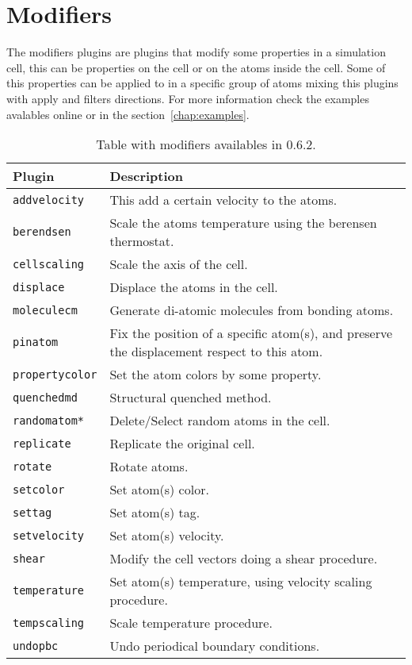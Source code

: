\section{Modifiers}
The modifiers plugins are plugins that modify some properties in a simulation
cell, this can be properties on the cell or on the atoms inside the cell. Some
of this properties can be applied to in a specific group of atoms mixing this
plugins with apply and filters directions. For more information check the
examples avalables online or in the section~\ref{chap:examples}.

\begin{table}[h!]\centering
 \begin{tabular}{|l|p{13cm}|}\hline
 Plugin  & Description \\
 \hline\hline
 \texttt{addvelocity} & This add a certain velocity to the atoms.\\
 \hline
 \texttt{berendsen} & Scale the atoms temperature using the berensen
 thermostat.\\
 \hline
 \texttt{cellscaling} & Scale the axis of the cell.\\
 \hline
 \texttt{displace} & Displace the atoms in the cell.\\
 \hline
 \texttt{moleculecm} & Generate di-atomic molecules from bonding atoms.\\
 \hline
 \texttt{pinatom} & Fix the position of a specific atom(s), and preserve the
 displacement respect to this atom.\\
 \hline
 \texttt{propertycolor} & Set the atom colors by some property.\\
 \hline
 \texttt{quenchedmd} & Structural quenched method.\\
 \hline
 \texttt{randomatom*} & Delete/Select random atoms in the cell.\\
 \hline
 \texttt{replicate} & Replicate the original cell.\\
 \hline
 \texttt{rotate} & Rotate atoms.\\
 \hline
 \texttt{setcolor} & Set atom(s) color.\\
 \hline
 \texttt{settag} & Set atom(s) tag.\\
 \hline
 \texttt{setvelocity} & Set atom(s) velocity.\\
 \hline
 \texttt{shear} & Modify the cell vectors doing a shear procedure.\\
 \hline
 \texttt{temperature} & Set atom(s) temperature, using velocity scaling
 procedure.\\
 \hline
 \texttt{tempscaling} & Scale temperature procedure.\\
 \hline
 \texttt{undopbc} & Undo periodical boundary conditions.\\
 \hline
 \end{tabular}
\label{tab:modmodify}
\caption{Table with modifiers availables in {\lpmd} 0.6.2.}
\end{table}


